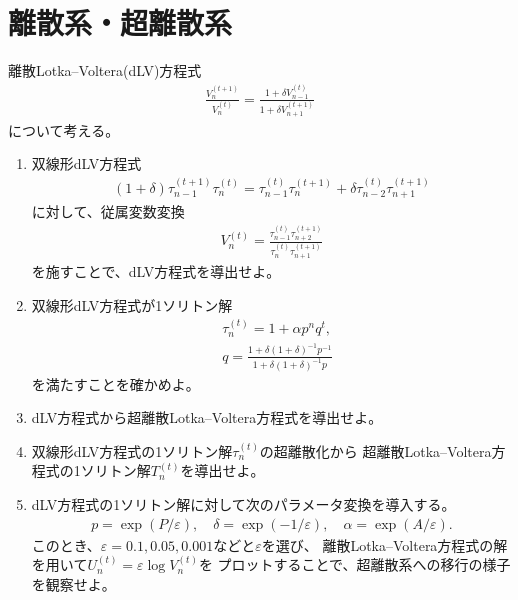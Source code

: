 \documentclass{jsarticle}
\begin{document}
\section{離散系・超離散系}
\begin{shaded}
離散Lotka--Voltera(dLV)方程式
\begin{align}
\frac{V_{n}^{(t+1)}}{V_{n}^{(t)}}=\frac{1+\delta V_{n-1}^{(t)}}{1+\delta V_{n+1}^{(t+1)}}
\end{align}
について考える。
\begin{enumerate}
\item 双線形dLV方程式
\begin{align}
(1+\delta)\tau_{n-1}^{(t+1)}\tau_{n}^{(t)}=\tau_{n-1}^{(t)}\tau_{n}^{(t+1)}+\delta\tau_{n-2}^{(t)}\tau_{n+1}^{(t+1)}
\end{align}
に対して、従属変数変換
\begin{align}
V_{n}^{(t)}=\frac{\tau_{n-1}^{(t)}\tau_{n+2}^{(t+1)}}{\tau_{n}^{(t)}\tau_{n+1}^{(t+1)}}
\end{align}
を施すことで、dLV方程式を導出せよ。
\item 双線形dLV方程式が1ソリトン解
\begin{align}
&\tau_{n}^{(t)}=1+\alpha p^{n}q^{t},\\
&q=\frac{1+\delta(1+\delta)^{-1}p^{-1}}{1+\delta(1+\delta)^{-1}p}
\end{align}
を満たすことを確かめよ。
\item dLV方程式から超離散Lotka--Voltera方程式を導出せよ。
\item 双線形dLV方程式の1ソリトン解$\tau_{n}^{(t)}$の超離散化から
超離散Lotka--Voltera方程式の1ソリトン解$T_{n}^{(t)}$を導出せよ。
\item dLV方程式の1ソリトン解に対して次のパラメータ変換を導入する。
\begin{align}
p=\exp(P/\varepsilon),\quad
\delta=\exp(-1/\varepsilon),\quad
\alpha=\exp(A/\varepsilon).
\end{align}
このとき、$\varepsilon=0.1,0.05,0.001$などと$\varepsilon$を選び、
離散Lotka--Voltera方程式の解を用いて$U_{n}^{(t)}=\varepsilon\log V_{n}^{(t)}$を
プロットすることで、超離散系への移行の様子を観察せよ。
\end{enumerate}
\end{shaded}
\end{document}
